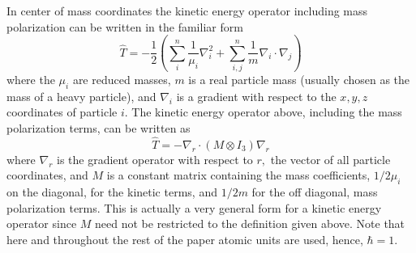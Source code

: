 \documentclass[12pt,thmsa,suthesis,verbatim]{report}
\begin{document}
In center of mass coordinates the kinetic energy operator including mass
polarization can be written in the familiar form\cite{Kinghorn93} 
\begin{equation}
\hat T=-\frac 12\left( \sum_i^n\frac 1{\mu _i}\nabla _i^2+\sum_{i,j}^n\frac
1m\nabla _i\cdot \nabla _j\right)  \label{top1}
\end{equation}
where the $\mu _i$ are reduced masses, $m$ is a real particle mass (usually
chosen as the mass of a heavy particle), and $\nabla _i$ is a gradient with
respect to the $x,y,z$ coordinates of particle $i$. The kinetic energy
operator above, including the mass polarization terms, can be written as 
\begin{equation}
\hat T=-\nabla _r\cdot \left( M\otimes I_3\right) \nabla _r  \label{top2}
\end{equation}
where $\nabla _r$ is the gradient operator with respect to $r,$ the vector
of all particle coordinates, and $M$ is a constant matrix containing the
mass coefficients, $1/2\mu _i$ on the diagonal, for the kinetic terms, and $%
1/2m$ for the off diagonal, mass polarization terms. This is actually a very
general form for a kinetic energy operator since $M$ need not be restricted
to the definition given above. Note that here and throughout the rest of the
paper atomic units are used, hence, $\hbar =1$.
\end{document}
